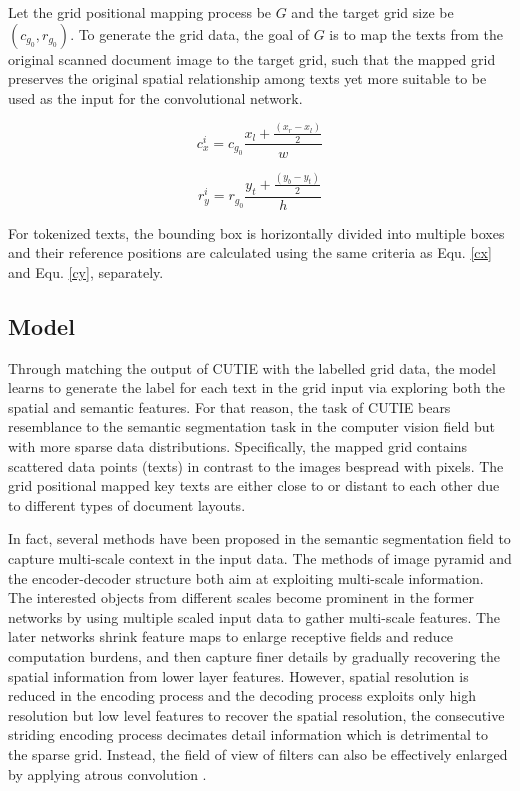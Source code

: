 \documentclass[10pt,twocolumn,letterpaper]{article}
\begin{document}
Let the grid positional mapping process be $G$ and the target grid size be $(c_{g_0}, r_{g_0})$. To generate the grid data, the goal of $G$ is to map the texts from the original scanned document image to the target grid, such that the mapped grid preserves the original spatial relationship among texts yet more suitable to be used as the input for the convolutional network. 

\begin{equation}
\label{cx}
c^i_x = c_{g_0} \frac{x_l + \frac{(x_r - x_l)}{2}}{w}
\end{equation}

\begin{equation}
\label{cy}
r^i_y = r_{g_0} \frac{y_t + \frac{(y_b - y_t)}{2}}{h}
\end{equation}

For tokenized texts, the bounding box is horizontally divided into multiple boxes and their reference positions are calculated using the same criteria as Equ. \ref{cx} and Equ. \ref{cy}, separately.

\subsection{Model}
Through matching the output of CUTIE with the labelled grid data, the model learns to generate the label for each text in the grid input via exploring both the spatial and semantic features. For that reason, the task of CUTIE bears resemblance to the semantic segmentation task in the computer vision field but with more sparse data distributions. Specifically, the mapped grid contains scattered data points (texts) in contrast to the images bespread with pixels. The grid positional mapped key texts are either close to or distant to each other due to different types of document layouts. 

In fact, several methods have been proposed in the semantic segmentation field to capture multi-scale context in the input data. The methods of image pyramid and the encoder-decoder structure both aim at exploiting multi-scale information. The interested objects from different scales become prominent in the former networks by using multiple scaled input data to gather multi-scale features. The later networks shrink feature maps to enlarge receptive fields and reduce computation burdens, and then capture finer details by gradually recovering the spatial information from lower layer features. However, spatial resolution is reduced in the encoding process and the decoding process exploits only high resolution but low level features to recover the spatial resolution, the consecutive striding encoding process decimates detail information which is detrimental to the sparse grid. Instead, the field of view of filters can also be effectively enlarged by applying atrous convolution \cite{deeplab, deeplabv1, deeplabv3, deeplabv3p}. 
\end{document}
